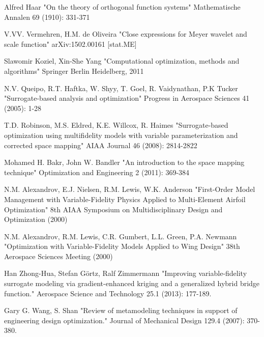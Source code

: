 \documentclass[a4paper,onecolumn]{article}
\theoremstyle{remark}
\begin{document}
\begin{thebibliography}{9}
Alfred Haar
"On the theory of orthogonal function systems"
Mathematische Annalen 69 (1910): 331-371

V.VV. Vermehren, H.M. de Oliveira
"Close expressions for Meyer wavelet and scale function"
arXiv:1502.00161 [stat.ME]

Slawomir Koziel, Xin-She Yang
"Computational optimization, methods and algorithms"
Springer Berlin Heidelberg, 2011

N.V. Queipo, R.T. Haftka, W. Shyy, T. Goel, R. Vaidynathan, P.K Tucker
"Surrogate-based analysis and optimization"
Progress in Aerospace Sciences 41 (2005): 1-28

T.D. Robinson, M.S. Eldred, K.E. Willcox, R. Haimes
"Surrogate-based optimization using multifidelity models with variable 
parameterization and corrected space mapping"
AIAA Journal 46 (2008): 2814-2822

Mohamed H. Bakr, John W. Bandler
"An introduction to the space mapping technique"
Optimization and Engineering 2 (2011): 369-384

N.M. Alexandrov, E.J. Nielsen, R.M. Lewis, W.K. Anderson
"First-Order Model Management with Variable-Fidelity Physics 
Applied to Multi-Element Airfoil Optimization"
8th AIAA Symposium on Multidisciplinary Design and Optimization (2000)


N.M. Alexandrov, R.M. Lewis, C.R. Gumbert, L.L. Green, P.A. Newmann
"Optimization with Variable-Fidelity Models Applied to Wing Design"
38th Aerospace Sciences Meeting (2000)

Han Zhong-Hua, Stefan Görtz, Ralf Zimmermann
"Improving variable-fidelity surrogate modeling via gradient-enhanced kriging and a generalized hybrid bridge function."
Aerospace Science and Technology 25.1 (2013): 177-189.

Gary G. Wang, S. Shan
"Review of metamodeling techniques in support of engineering design optimization."
Journal of Mechanical Design 129.4 (2007): 370-380.


\end{thebibliography}
\end{document}
